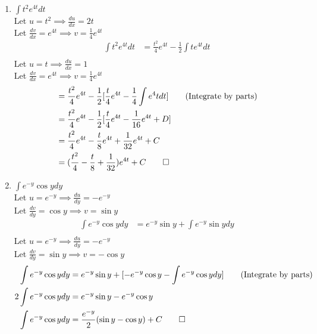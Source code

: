 \documentclass[12pt, a4paper]{article}
\begin{document}
\begin{enumerate}[Q\arabic*.]
\begin{enumerate}[(\alph*)]
      \item $\displaystyle \int t^2e^{4t} dt$\\
        Let $u = t^2 \implies \frac{du}{dx} = 2t$\\
        Let $\frac{dv}{dx} = e^{4t} \implies v = \frac{1}{4}e^{4t}$
        \begin{align*}
          \int t^2e^{4t} dt &= \frac{t^2}{4}e^{4t} - \frac{1}{2}\int te^{4t} dt\tag*{(Integrate by parts)}\\
        \end{align*}
        Let $u = t \implies \frac{du}{dx} = 1$\\
        Let $\frac{dv}{dx} = e^{4t} \implies v = \frac{1}{4}e^{4t}$
        \begin{align*}
          &= \frac{t^2}{4}e^{4t} - \frac{1}{2}[\frac{t}{4}e^{4t} - \frac{1}{4}\int e^4t dt]\tag*{(Integrate by parts)}\\
          &= \frac{t^2}{4}e^{4t} - \frac{1}{2}[\frac{t}{4}e^{4t} - \frac{1}{16}e^{4t} + D]\\
          &= \frac{t^2}{4}e^{4t} - \frac{t}{8}e^{4t}+\frac{1}{32}e^{4t} + C\\
          &= (\frac{t^2}{4} - \frac{t}{8} + \frac{1}{32})e^{4t} + C \qed
        \end{align*}

      \item $\displaystyle \int e^{-y}\cos y dy$\\
        Let $u = e^{-y} \implies \frac{du}{dy} = -e^{-y}$\\
        Let $\frac{dv}{dy} = \cos y \implies v = \sin y$
        \begin{align*}
          \int e^{-y}\cos y dy &= e^{-y}\sin y + \int e^{-y}\sin y dy\tag*{(Integrate by parts)}\\
        \end{align*}
        Let $u = e^{-y} \implies \frac{du}{dy} = -e^{-y}$\\
        Let $\frac{dv}{dy} = \sin y \implies v = -\cos y$
        \begin{align*}
          \int e^{-y}\cos y dy &= e^{-y}\sin y + [-e^{-y}\cos y - \int e^{-y}\cos y dy]\tag*{(Integrate by parts)}\\
            2\int e^{-y}\cos y dy &= e^{-y}\sin y - e^{-y}\cos y \\
            \int e^{-y}\cos y dy &= \frac{e^{-y}}{2}(\sin y - \cos y) + C \qed
        \end{align*}
    \end{enumerate}


\end{enumerate}
\end{document}
